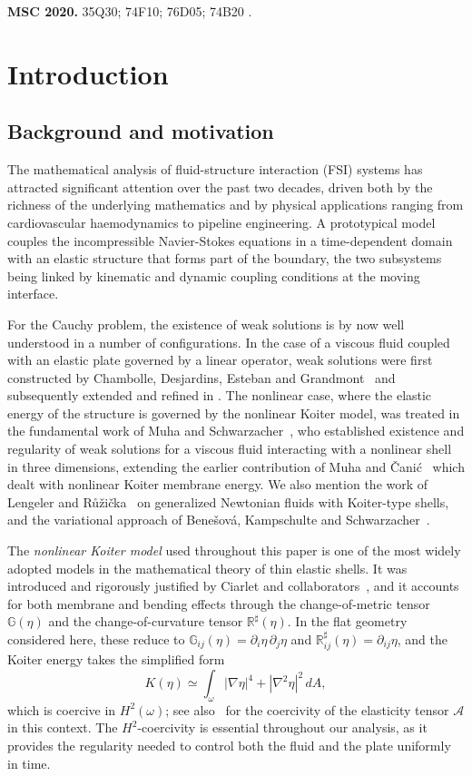 \documentclass[10pt,a4paper]{article}
\numberwithin{equation}{section}
\begin{document}
\medskip
\noindent\textbf{MSC 2020.} 35Q30; 74F10; 76D05; 	74B20 .

\section{Introduction}\label{sec:intro}

\subsection{Background and motivation}

The mathematical analysis of fluid-structure interaction (FSI) systems has attracted significant
attention over the past two decades, driven both by the richness of the underlying mathematics
and by physical applications ranging from cardiovascular haemodynamics to pipeline engineering.
A prototypical model couples the incompressible Navier-Stokes equations in a time-dependent
domain with an elastic structure that forms part of the boundary, the two subsystems being
linked by kinematic and dynamic coupling conditions at the moving interface.

For the Cauchy problem, the existence of weak solutions is by now well understood in a number
of configurations. In the case of a viscous fluid coupled with an elastic plate governed by a
linear operator, weak solutions were first constructed by Chambolle, Desjardins, Esteban and
Grandmont~\cite{chambolle2005existence} and subsequently extended and refined in
\cite{Gr08, LR14, Lengeler16}. The nonlinear case, where the elastic energy of the structure is
governed by the nonlinear Koiter model, was treated in the fundamental work of
Muha and Schwarzacher~\cite{MS22}, who established existence and regularity of weak solutions
for a viscous fluid interacting with a nonlinear shell in three dimensions, extending the
earlier contribution of Muha and \v{C}ani\'{c}~\cite{MC15} which dealt with nonlinear Koiter
membrane energy. We also mention the work of Lengeler and R\r{u}\v{z}i\v{c}ka~\cite{LR14}
on generalized Newtonian fluids with Koiter-type shells, and the variational approach of
Bene\v{s}ov\'{a}, Kampschulte and Schwarzacher~\cite{BKS23}.

The \emph{nonlinear Koiter model} used throughout this paper is one of the most widely adopted
models in the mathematical theory of thin elastic shells. It was introduced and rigorously
justified by Ciarlet and collaborators~\cite{ciarlet2000theory, Ciarlet05, ciarlet2018nonlinear},
and it accounts for both membrane and bending effects through the change-of-metric tensor
$\mathbb{G}(\eta)$ and the change-of-curvature tensor $\mathbb{R}^\sharp(\eta)$.
In the flat geometry considered here, these reduce to
$\mathbb{G}_{ij}(\eta) = \partial_i\eta\,\partial_j\eta$ and
$\mathbb{R}^\sharp_{ij}(\eta) = \partial_{ij}\eta$,
and the Koiter energy takes the simplified form
\[
K(\eta) \simeq \int_\omega |\nabla\eta|^4 + |\nabla^2\eta|^2\,dA,
\]
which is coercive in $H^2(\omega)$; see also~\cite{ciarlet-roquefort-2001} for the
coercivity of the elasticity tensor $\mathcal{A}$ in this context.
The $H^2$-coercivity is essential throughout our analysis, as it provides the
regularity needed to control both the fluid and the plate uniformly in time.
\end{document}
